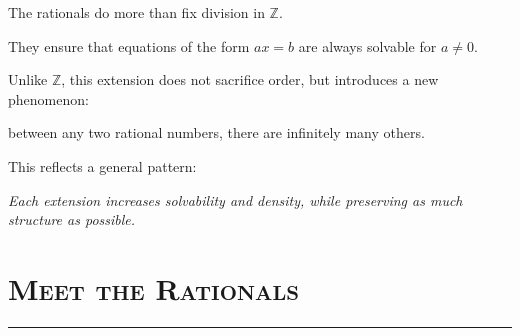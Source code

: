 \documentclass[11pt]{article}
\newcommand{\Z}{\mathbb{Z}}
\newcommand{\sepline}{
    \vspace{0.5em}
    \hrule
    \vspace{1em}
}
\begin{document}
\begin{remarkbox}

The rationals do more than fix division in $\Z$.

They ensure that equations of the form $ax = b$ are always solvable 
for $a \neq 0$.

Unlike $\Z$, this extension does not sacrifice order, 
but introduces a new phenomenon:

between any two rational numbers, there are infinitely many others.

This reflects a general pattern:

\textit{Each extension increases solvability and density, 
while preserving as much structure as possible.}

\end{remarkbox}

\section*{\textsc{Meet the Rationals}}
\sepline
\end{document}
